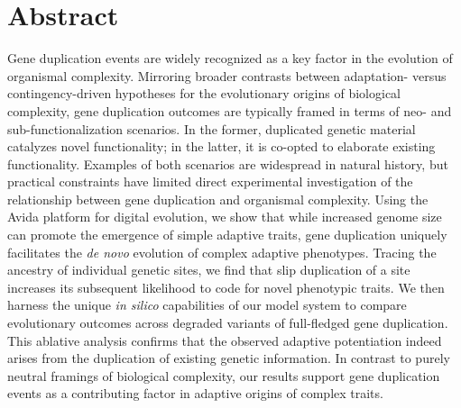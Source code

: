 \section*{Abstract}

Gene duplication events are widely recognized as a key factor in the evolution of organismal complexity.
Mirroring broader contrasts between adaptation- versus contingency-driven hypotheses for the evolutionary origins of biological complexity, gene duplication outcomes are typically framed in terms of neo- and sub-functionalization scenarios.
In the former, duplicated genetic material catalyzes novel functionality; in the latter, it is co-opted to elaborate existing functionality.
Examples of both scenarios are widespread in natural history, but practical constraints have limited direct experimental investigation of the relationship between gene duplication and organismal complexity.
Using the Avida platform for digital evolution, we show that while increased genome size can promote the emergence of simple adaptive traits, gene duplication uniquely facilitates the \textit{de novo} evolution of complex adaptive phenotypes.
Tracing the ancestry of individual genetic sites, we find that slip duplication of a site increases its subsequent likelihood to code for novel phenotypic traits.
We then harness the unique \textit{in silico} capabilities of our model system to compare evolutionary outcomes across degraded variants of full-fledged gene duplication.
This ablative analysis confirms that the observed adaptive potentiation indeed arises from the duplication of existing genetic information.
In contrast to purely neutral framings of biological complexity, our results support gene duplication events as a contributing factor in adaptive origins of complex traits.
